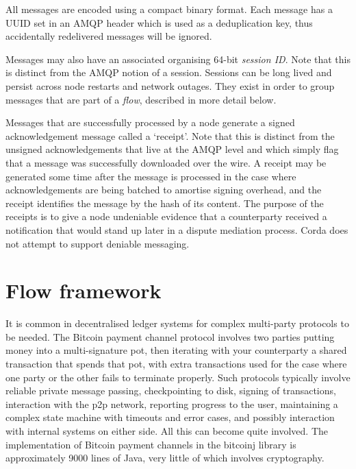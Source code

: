 \documentclass{article}
\begin{document}
All messages are encoded using a compact binary format. Each message has a UUID set in an AMQP header which is used
as a deduplication key, thus accidentally redelivered messages will be ignored.


Messages may also have an associated organising 64-bit \emph{session ID}. Note that this is distinct from the AMQP
notion of a session. Sessions can be long lived and persist across node restarts and network outages. They exist in order
to group messages that are part of a \emph{flow}, described in more detail below.

Messages that are successfully processed by a node generate a signed acknowledgement message called a `receipt'. Note that
this is distinct from the unsigned acknowledgements that live at the AMQP level and which simply flag that a message was
successfully downloaded over the wire. A receipt may be generated some time after the message is processed in the case
where acknowledgements are being batched to amortise signing overhead, and the receipt identifies the message by the hash
of its content. The purpose of the receipts is to give a node undeniable evidence that a counterparty received a
notification that would stand up later in a dispute mediation process. Corda does not attempt to support deniable
messaging.

\section{Flow framework}

It is common in decentralised ledger systems for complex multi-party protocols to be needed. The Bitcoin payment channel
protocol\cite{PaymentChannels} involves two parties putting money into a multi-signature pot, then iterating with your
counterparty a shared transaction that spends that pot, with extra transactions used for the case where one party or the
other fails to terminate properly. Such protocols typically involve reliable private message passing, checkpointing to
disk, signing of transactions, interaction with the p2p network, reporting progress to the user, maintaining a complex
state machine with timeouts and error cases, and possibly interaction with internal systems on either side. All
this can become quite involved. The implementation of Bitcoin payment channels in the bitcoinj library is approximately
9000 lines of Java, very little of which involves cryptography.
\end{document}
